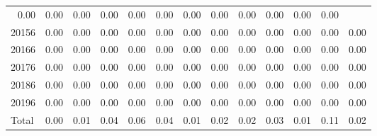 \begin{table}[!h]
\begin{tabular}{lllllllllllll}
  \multicolumn{1}{|r}{0.00} &
  \multicolumn{1}{r}{0.00} &
  \multicolumn{1}{r}{0.00} &
  \multicolumn{1}{r}{0.00} &
  \multicolumn{1}{r}{0.00} &
  \multicolumn{1}{r}{0.00} &
  \multicolumn{1}{r}{0.00} &
  \multicolumn{1}{r}{0.00} &
  \multicolumn{1}{r}{0.00} &
  \multicolumn{1}{r}{0.00} &
  \multicolumn{1}{r}{0.00} &
  \multicolumn{1}{r}{0.00} \\
\multicolumn{1}{l}{\hspace{1em}20156} &
  \multicolumn{1}{|r}{0.00} &
  \multicolumn{1}{r}{0.00} &
  \multicolumn{1}{r}{0.00} &
  \multicolumn{1}{r}{0.00} &
  \multicolumn{1}{r}{0.00} &
  \multicolumn{1}{r}{0.00} &
  \multicolumn{1}{r}{0.00} &
  \multicolumn{1}{r}{0.00} &
  \multicolumn{1}{r}{0.00} &
  \multicolumn{1}{r}{0.00} &
  \multicolumn{1}{r}{0.00} &
  \multicolumn{1}{r}{0.00} \\
\multicolumn{1}{l}{\hspace{1em}20166} &
  \multicolumn{1}{|r}{0.00} &
  \multicolumn{1}{r}{0.00} &
  \multicolumn{1}{r}{0.00} &
  \multicolumn{1}{r}{0.00} &
  \multicolumn{1}{r}{0.00} &
  \multicolumn{1}{r}{0.00} &
  \multicolumn{1}{r}{0.00} &
  \multicolumn{1}{r}{0.00} &
  \multicolumn{1}{r}{0.00} &
  \multicolumn{1}{r}{0.00} &
  \multicolumn{1}{r}{0.00} &
  \multicolumn{1}{r}{0.00} \\
\multicolumn{1}{l}{\hspace{1em}20176} &
  \multicolumn{1}{|r}{0.00} &
  \multicolumn{1}{r}{0.00} &
  \multicolumn{1}{r}{0.00} &
  \multicolumn{1}{r}{0.00} &
  \multicolumn{1}{r}{0.00} &
  \multicolumn{1}{r}{0.00} &
  \multicolumn{1}{r}{0.00} &
  \multicolumn{1}{r}{0.00} &
  \multicolumn{1}{r}{0.00} &
  \multicolumn{1}{r}{0.00} &
  \multicolumn{1}{r}{0.00} &
  \multicolumn{1}{r}{0.00} \\
\multicolumn{1}{l}{\hspace{1em}20186} &
  \multicolumn{1}{|r}{0.00} &
  \multicolumn{1}{r}{0.00} &
  \multicolumn{1}{r}{0.00} &
  \multicolumn{1}{r}{0.00} &
  \multicolumn{1}{r}{0.00} &
  \multicolumn{1}{r}{0.00} &
  \multicolumn{1}{r}{0.00} &
  \multicolumn{1}{r}{0.00} &
  \multicolumn{1}{r}{0.00} &
  \multicolumn{1}{r}{0.00} &
  \multicolumn{1}{r}{0.00} &
  \multicolumn{1}{r}{0.00} \\
\multicolumn{1}{l}{\hspace{1em}20196} &
  \multicolumn{1}{|r}{0.00} &
  \multicolumn{1}{r}{0.00} &
  \multicolumn{1}{r}{0.00} &
  \multicolumn{1}{r}{0.00} &
  \multicolumn{1}{r}{0.00} &
  \multicolumn{1}{r}{0.00} &
  \multicolumn{1}{r}{0.00} &
  \multicolumn{1}{r}{0.00} &
  \multicolumn{1}{r}{0.00} &
  \multicolumn{1}{r}{0.00} &
  \multicolumn{1}{r}{0.00} &
  \multicolumn{1}{r}{0.00} \\
\multicolumn{1}{l}{\hspace{1em}Total} &
  \multicolumn{1}{|r}{0.00} &
  \multicolumn{1}{r}{0.01} &
  \multicolumn{1}{r}{0.04} &
  \multicolumn{1}{r}{0.06} &
  \multicolumn{1}{r}{0.04} &
  \multicolumn{1}{r}{0.01} &
  \multicolumn{1}{r}{0.02} &
  \multicolumn{1}{r}{0.02} &
  \multicolumn{1}{r}{0.03} &
  \multicolumn{1}{r}{0.01} &
  \multicolumn{1}{r}{0.11} &
  \multicolumn{1}{r}{0.02} \\
\cline{1-13}
\end{tabular}
\end{table}
